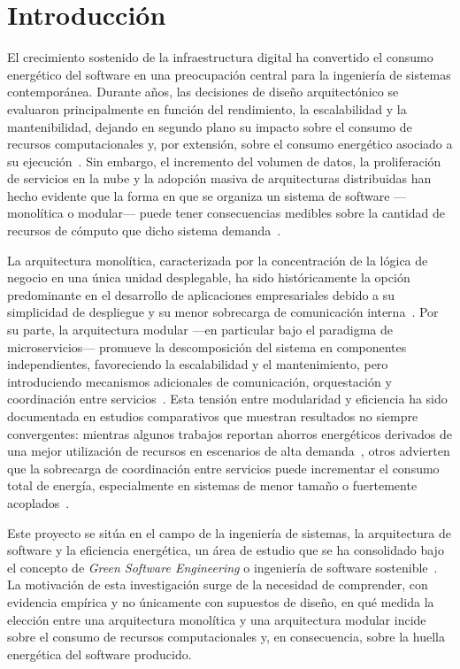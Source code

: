 \chapter*{Introducción}

El crecimiento sostenido de la infraestructura digital ha convertido el consumo energético del software en una preocupación central para la ingeniería de sistemas contemporánea. Durante años, las decisiones de diseño arquitectónico se evaluaron principalmente en función del rendimiento, la escalabilidad y la mantenibilidad, dejando en segundo plano su impacto sobre el consumo de recursos computacionales y, por extensión, sobre el consumo energético asociado a su ejecución~\cite{kern2018sustainable}. Sin embargo, el incremento del volumen de datos, la proliferación de servicios en la nube y la adopción masiva de arquitecturas distribuidas han hecho evidente que la forma en que se organiza un sistema de software ---monolítica o modular--- puede tener consecuencias medibles sobre la cantidad de recursos de cómputo que dicho sistema demanda~\cite{araujo2024energy}.

La arquitectura monolítica, caracterizada por la concentración de la lógica de negocio en una única unidad desplegable, ha sido históricamente la opción predominante en el desarrollo de aplicaciones empresariales debido a su simplicidad de despliegue y su menor sobrecarga de comunicación interna~\cite{aldebagy2018comparative}. Por su parte, la arquitectura modular ---en particular bajo el paradigma de microservicios--- promueve la descomposición del sistema en componentes independientes, favoreciendo la escalabilidad y el mantenimiento, pero introduciendo mecanismos adicionales de comunicación, orquestación y coordinación entre servicios~\cite{su2024microservice}. Esta tensión entre modularidad y eficiencia ha sido documentada en estudios comparativos que muestran resultados no siempre convergentes: mientras algunos trabajos reportan ahorros energéticos derivados de una mejor utilización de recursos en escenarios de alta demanda~\cite{capuano2026comparative}, otros advierten que la sobrecarga de coordinación entre servicios puede incrementar el consumo total de energía, especialmente en sistemas de menor tamaño o fuertemente acoplados~\cite{jagroep2017extending}.

Este proyecto se sitúa en el campo de la ingeniería de sistemas, la arquitectura de software y la eficiencia energética, un área de estudio que se ha consolidado bajo el concepto de \textit{Green Software Engineering} o ingeniería de software sostenible~\cite{capra2012green}. La motivación de esta investigación surge de la necesidad de comprender, con evidencia empírica y no únicamente con supuestos de diseño, en qué medida la elección entre una arquitectura monolítica y una arquitectura modular incide sobre el consumo de recursos computacionales y, en consecuencia, sobre la huella energética del software producido.

